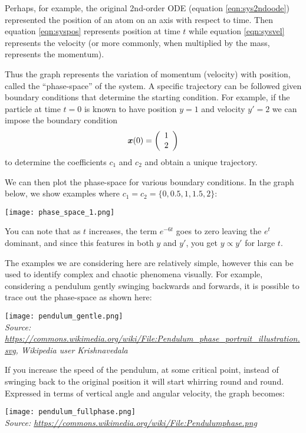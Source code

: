 Perhaps, for example, the original 2nd-order ODE (equation \ref{eqn:sys2ndoode}) represented the position of an atom on an axis with respect to time. Then equation \ref{eqn:syspos} represents position at time $t$ while equation \ref{eqn:sysvel} represents the velocity (or more commonly, when multiplied by the mass, represents the momentum).

Thus the graph represents the variation of momentum (velocity) with position, called the ``phase-space'' of the system. A specific trajectory can be followed given boundary conditions that determine the starting condition. For example, if the particle at time $t=0$ is known to have position $y=1$ and velocity $y'=2$ we can impose the boundary condition
\begin{equation}
    \bm{x}(0) = \left(\begin{array}{c}{1}\\{2}\end{array}\right)
\end{equation}
to determine the coefficients $c_1$ and $c_2$ and obtain a unique trajectory.

We can then plot the phase-space for various boundary conditions. In the graph below, we show examples where $c_1 = c_2 = \{0, 0.5, 1, 1.5, 2\}$:

\texttt{[image: phase\_space\_1.png]}

You can note that as $t$ increases, the term $e^{-6t}$ goes to zero leaving the $e^t$ dominant, and since this features in both $y$ and $y'$, you get $y \propto y'$ for large $t$. %

The examples we are considering here are relatively simple, however this can be used to identify complex and chaotic phenomena visually. For example, considering a pendulum gently swinging backwards and forwards, it is possible to trace out the phase-space as shown here:

\texttt{[image: pendulum\_gentle.png]}\\
\emph{\small{Source: \url{https://commons.wikimedia.org/wiki/File:Pendulum_phase_portrait_illustration.svg}, Wikipedia user Krishnavedala}}

If you increase the speed of the pendulum, at some critical point, instead of swinging back to the original position it will start whirring round and round. Expressed in terms of vertical angle and angular velocity, the graph becomes:

\texttt{[image: pendulum\_fullphase.png]}\\
\emph{\small{Source: \url{https://commons.wikimedia.org/wiki/File:Pendulumphase.png}}}

